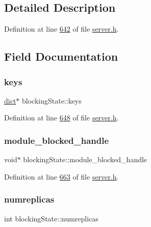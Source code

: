 \subsection{Detailed Description}


Definition at line \hyperlink{server_8h_source_l00642}{642} of file \hyperlink{server_8h_source}{server.\+h}.



\subsection{Field Documentation}
\mbox{\label{structblockingState_ab76625095616dfdca84124a7f55db2e5}} 
\subsubsection{\texorpdfstring{keys}{keys}}
{\footnotesize\ttfamily \hyperlink{structdict}{dict}$\ast$ blocking\+State\+::keys}



Definition at line \hyperlink{server_8h_source_l00648}{648} of file \hyperlink{server_8h_source}{server.\+h}.

\mbox{\label{structblockingState_a7b553428255ee211a00c9a9735a84108}} 
\subsubsection{\texorpdfstring{module\+\_\+blocked\+\_\+handle}{module\_blocked\_handle}}
{\footnotesize\ttfamily void$\ast$ blocking\+State\+::module\+\_\+blocked\+\_\+handle}



Definition at line \hyperlink{server_8h_source_l00663}{663} of file \hyperlink{server_8h_source}{server.\+h}.

\mbox{\label{structblockingState_a881488caa5361c95b8369973c891ac21}} 
\subsubsection{\texorpdfstring{numreplicas}{numreplicas}}
{\footnotesize\ttfamily int blocking\+State\+::numreplicas}



